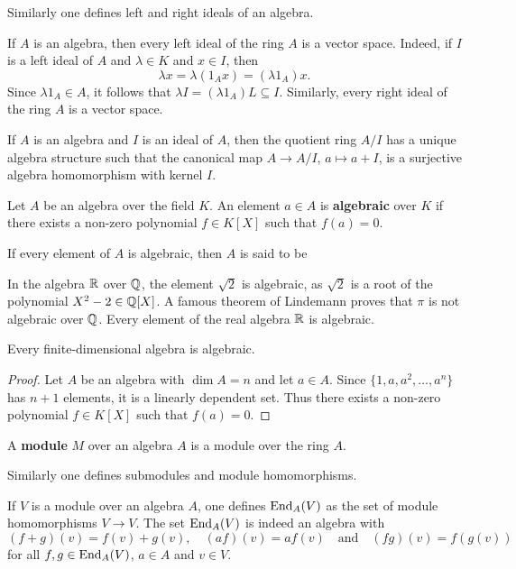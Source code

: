 Similarly one defines left and right ideals of an algebra.

If $A$ is an algebra, then every left ideal of the ring $A$ is a vector space.  
Indeed, if $I$ is a left ideal of $A$ 
and $\lambda\in K$ and $x\in I$, then 
\[
	\lambda x=\lambda (1_Ax)=(\lambda 1_A)x.
\]
Since $\lambda 1_A\in A$, it follows that  $\lambda I=(\lambda
1_A)L\subseteq I$. 
Similarly, every right ideal of the ring $A$ is a vector space. 

If $A$ is an algebra and $I$ is an ideal of $A$, then the quotient ring $A/I$ has a unique algebra
structure such that the canonical map  
$A\to A/I$, $a\mapsto a+I$, is a surjective algebra homomorphism with kernel $I$. 

\begin{definition}
    Let $A$ be an algebra over the field $K$. An element $a\in A$ is 
    \textbf{algebraic} over $K$ if there exists a non-zero polynomial $f\in K[X]$
    such that $f(a)=0$. 
\end{definition}

If every element of $A$ is algebraic, then $A$ is said to be  

In the algebra $\mathbb{R}$ over $\mathbb{Q}$, the element $\sqrt{2}$ is algebraic, as $\sqrt{2}$ is a root of the polynomial $X^2-2\in\mathbb{Q}[X]$. A famous theorem of Lindemann proves that $\pi$ is not algebraic over $\mathbb{Q}$. Every element of the real algebra $\mathbb{R}$ is algebraic.

\begin{proposition}
	\label{lem:algebraic}
	Every finite-dimensional algebra is algebraic.
\end{proposition}

\begin{proof}
   Let $A$ be an algebra with $\dim A=n$ and let $a\in A$. Since  
	$\{1,a,a^2,\dots,a^n\}$ has $n+1$ elements, it is a linearly dependent set. Thus there exists 
	a non-zero polynomial $f\in K[X]$ such that $f(a)=0$.
\end{proof}

\begin{definition}
    A \textbf{module} $M$ over an algebra $A$ is a module 
    over the ring $A$.
\end{definition}

Similarly one defines submodules and module homomorphisms. 

\begin{example}
If $V$ is a module over an algebra $A$, one defines $\operatorname{End}_A(V)$ as the set
of module homomorphisms $V\to V$. The set  
$\operatorname{End}_A(V)$ is indeed an algebra with 
\[
(f+g)(v)=f(v)+g(v),\quad 
(af)(v)=af(v)
\quad\text{and}
\quad 
(fg)(v)=f(g(v))
\]
for all $f,g\in\operatorname{End}_A(V)$, $a\in A$ and $v\in V$. 
\end{example}

